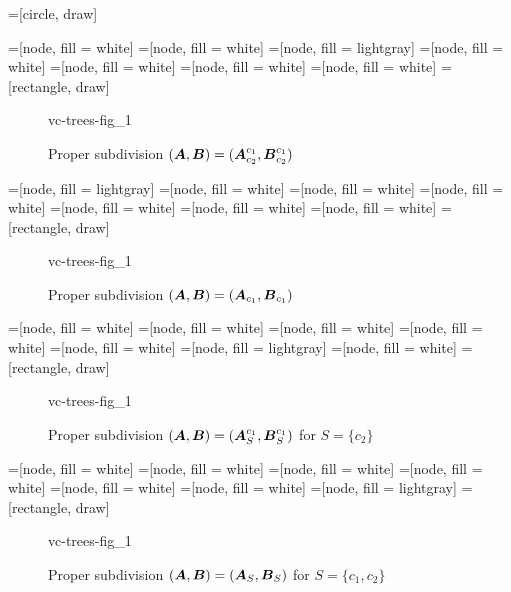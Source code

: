 
	=[circle, draw]

	=[node, fill = white]
	=[node, fill = white]
	=[node, fill = lightgray]
	=[node, fill = white]
	=[node, fill = white]
	=[node, fill = white]
	=[node, fill = white]
	=[rectangle, draw]

	\begin{figure}[p]
          \centering
		 {vc-trees-fig_1}
		\caption{Proper subdivision  $(\operatorname{\boldsymbol A}, \operatorname{\boldsymbol B}) = (\operatorname{\boldsymbol A}^{c_1}_{c_2}, \operatorname{\boldsymbol B}^{c_1}_{c_2})$}
	\end{figure}
	
	=[node, fill = lightgray]
	=[node, fill = white]
	=[node, fill = white]
	=[node, fill = white]
	=[node, fill = white]
	=[node, fill = white]
	=[node, fill = white]
	=[rectangle, draw]

	\begin{figure}[p]
          \centering
		 {vc-trees-fig_1}
		\caption{Proper subdivision  $(\operatorname{\boldsymbol A}, \operatorname{\boldsymbol B}) = (\operatorname{\boldsymbol A}_{c_1}, \operatorname{\boldsymbol B}_{c_1})$}
	\end{figure}

	=[node, fill = white]
	=[node, fill = white]
	=[node, fill = white]
	=[node, fill = white]
	=[node, fill = white]
	=[node, fill = lightgray]
	=[node, fill = white]
	=[rectangle, draw]

	\begin{figure}[p]
          \centering
		 {vc-trees-fig_1}
		\caption{Proper subdivision  $(\operatorname{\boldsymbol A}, \operatorname{\boldsymbol B}) = (\operatorname{\boldsymbol A}^{c_1}_S, \operatorname{\boldsymbol B}^{c_1}_S)$ for $S = \{c_2\}$}
	\end{figure}

	=[node, fill = white]
	=[node, fill = white]
	=[node, fill = white]
	=[node, fill = white]
	=[node, fill = white]
	=[node, fill = white]
	=[node, fill = lightgray]
	=[rectangle, draw]

	\begin{figure}[p]
          \centering
		 {vc-trees-fig_1}
		\caption{Proper subdivision  $(\operatorname{\boldsymbol A}, \operatorname{\boldsymbol B}) = (\operatorname{\boldsymbol A}_S, \operatorname{\boldsymbol B}_S)$ for $S = \{c_1, c_2\}$}
	\end{figure}
